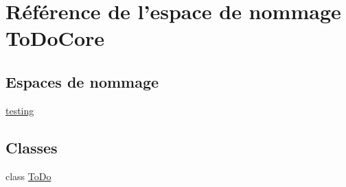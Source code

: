 \hypertarget{namespace_to_do_core}{\section{Référence de l'espace de nommage To\+Do\+Core}
\label{namespace_to_do_core}
}
\subsection*{Espaces de nommage}
\begin{DoxyCompactItemize}
\item 
 \hyperlink{namespace_to_do_core_1_1testing}{testing}
\end{DoxyCompactItemize}
\subsection*{Classes}
\begin{DoxyCompactItemize}
\item 
class \hyperlink{class_to_do_core_1_1_to_do}{To\+Do}
\end{DoxyCompactItemize}
